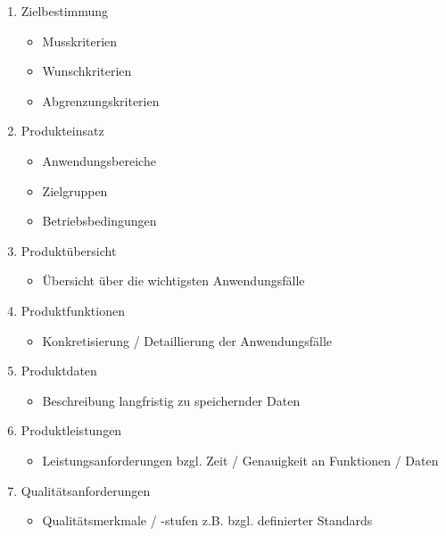 \documentclass{lehramt-informatik-haupt}
\begin{document}
\begin{enumerate}
\item Zielbestimmung

\begin{itemize}
\item Musskriterien
\item Wunschkriterien
\item Abgrenzungskriterien
\end{itemize}

\item Produkteinsatz

\begin{itemize}
\item Anwendungsbereiche
\item Zielgruppen
\item Betriebsbedingungen
\end{itemize}

\item Produktübersicht

\begin{itemize}
\item Übersicht über die wichtigsten Anwendungsfälle
\end{itemize}

\item Produktfunktionen

\begin{itemize}
\item Konkretisierung / Detaillierung der Anwendungsfälle
\end{itemize}

\item Produktdaten

\begin{itemize}
\item Beschreibung langfristig zu speichernder Daten
\end{itemize}

\item Produktleistungen

\begin{itemize}
\item Leistungsanforderungen bzgl. Zeit / Genauigkeit an Funktionen / Daten
\end{itemize}

\item Qualitätsanforderungen

\begin{itemize}
\item Qualitätsmerkmale / -stufen z.B. bzgl. definierter Standards
\end{itemize}


\end{enumerate}
\end{document}
